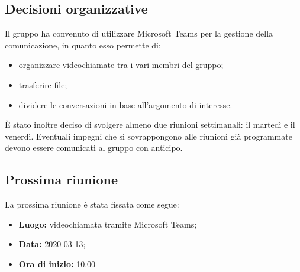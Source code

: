 \subsection{Decisioni organizzative}
Il gruppo ha convenuto di utilizzare Microsoft Teams per la gestione della comunicazione, in quanto esso permette di: 
\begin{itemize}
	\item organizzare videochiamate tra i vari membri del gruppo; 
	\item trasferire file; 
	\item dividere le conversazioni in base all'argomento di interesse.  
\end{itemize}
È stato inoltre deciso di svolgere almeno due riunioni settimanali: il martedì e il venerdì. Eventuali impegni che si sovrappongono alle riunioni già programmate devono essere comunicati al gruppo con anticipo. 

\subsection{Prossima riunione}
La prossima riunione è stata fissata come segue: 
\begin{itemize}
	\item \textbf{Luogo: } videochiamata tramite Microsoft Teams; 
	\item \textbf{Data: } 2020-03-13; 
	\item \textbf{Ora di inizio: } 10.00
\end{itemize}
